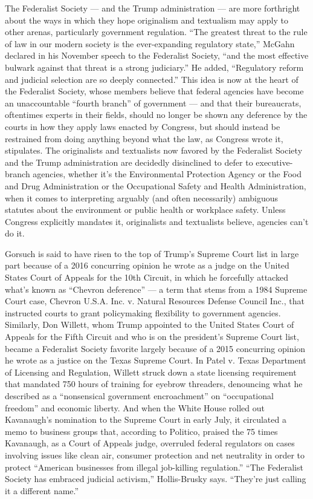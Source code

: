 The Federalist Society --- and the Trump administration --- are more
forthright about the ways in which they hope originalism and textualism
may apply to other arenas, particularly government regulation. ``The
greatest threat to the rule of law in our modern society is the
ever-expanding regulatory state,'' McGahn declared in his November
speech to the Federalist Society, ``and the most effective bulwark
against that threat is a strong judiciary.'' He added, ``Regulatory
reform and judicial selection are so deeply connected.'' This idea is
now at the heart of the Federalist Society, whose members believe that
federal agencies have become an unaccountable ``fourth branch'' of
government --- and that their bureaucrats, oftentimes experts in their
fields, should no longer be shown any deference by the courts in how
they apply laws enacted by Congress, but should instead be restrained
from doing anything beyond what the law, as Congress wrote it,
stipulates. The originalists and textualists now favored by the
Federalist Society and the Trump administration are decidedly
disinclined to defer to executive-branch agencies, whether it's the
Environmental Protection Agency or the Food and Drug Administration or
the Occupational Safety and Health Administration, when it comes to
interpreting arguably (and often necessarily) ambiguous statutes about
the environment or public health or workplace safety. Unless Congress
explicitly mandates it, originalists and textualists believe, agencies
can't do it.

Gorsuch is said to have risen to the top of Trump's Supreme Court list
in large part because of a 2016 concurring opinion he wrote as a judge
on the United States Court of Appeals for the 10th Circuit, in which he
forcefully attacked what's known as ``Chevron deference'' --- a term
that stems from a 1984 Supreme Court case, Chevron U.S.A. Inc. v.
Natural Resources Defense Council Inc., that instructed courts to grant
policymaking flexibility to government agencies. Similarly, Don Willett,
whom Trump appointed to the United States Court of Appeals for the Fifth
Circuit and who is on the president's Supreme Court list, became a
Federalist Society favorite largely because of a 2015 concurring opinion
he wrote as a justice on the Texas Supreme Court. In Patel v. Texas
Department of Licensing and Regulation, Willett struck down a state
licensing requirement that mandated 750 hours of training for eyebrow
threaders, denouncing what he described as a ``nonsensical government
encroachment'' on ``occupational freedom'' and economic liberty. And
when the White House rolled out Kavanaugh's nomination to the Supreme
Court in early July, it circulated a memo to business groups that,
according to Politico, praised the 75 times Kavanaugh, as a Court of
Appeals judge, overruled federal regulators on cases involving issues
like clean air, consumer protection and net neutrality in order to
protect ``American businesses from illegal job-killing regulation.''
``The Federalist Society has embraced judicial activism,'' Hollis-Brusky
says. ``They're just calling it a different name.''

